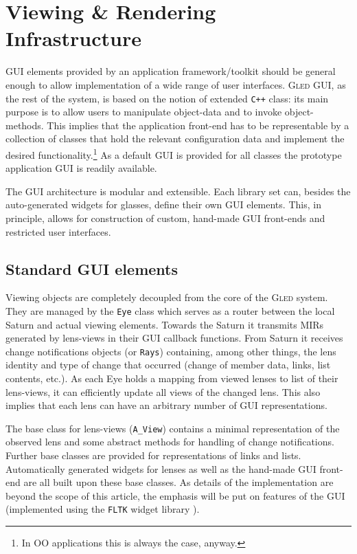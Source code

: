 \documentclass[final]{siamltex}
\def\gled{\textsc{Gled}\xspace}
\def\smalltt#1{{\small\texttt{#1}}}
\begin{document}
\section{Viewing \& Rendering Infrastructure}

GUI elements provided by an application framework/toolkit should be
general enough to allow implementation of a wide range of user
interfaces.  \gled GUI, as the rest of the system, is based on the
notion of extended \smalltt{C++} class: its main purpose is to allow
users to manipulate object-data and to invoke object-methods. This
implies that the application front-end has to be representable by a
collection of classes that hold the relevant configuration data and
implement the desired functionality.\footnote{In OO applications this
  is always the case, anyway.}  As a default GUI is provided for all
classes the prototype application GUI is readily available.

The GUI architecture is modular and extensible. Each library set can,
besides the auto-generated widgets for glasses, define their own GUI
elements. This, in principle, allows for construction of custom,
hand-made GUI front-ends and restricted user interfaces.

\subsection{Standard GUI elements}

Viewing objects are completely decoupled from the core of the \gled
system. They are managed by the \smalltt{Eye} class which serves as a
router between the local Saturn and actual viewing elements. Towards
the Saturn it transmits MIRs generated by lens-views in their GUI
callback functions. From Saturn it receives change notifications
objects (or \smalltt{Rays}) containing, among other things, the lens
identity and type of change that occurred (change of member data, links,
list contents, etc.). As each Eye holds a mapping from viewed
lenses to list of their lens-views, it can efficiently update all
views of the changed lens. This also implies that each lens can have
an arbitrary number of GUI representations.

The base class for lens-views (\smalltt{A\_View}) contains a minimal
representation of the observed lens and some abstract methods for handling
of change notifications. Further base classes are provided for
representations of links and lists.
%
Automatically generated widgets for lenses as well as the hand-made GUI
front-end are all built upon these base classes. As details of the
implementation are beyond the scope of this article, the emphasis will
be put on features of the GUI (implemented using the \smalltt{FLTK}
widget library \cite{fltk}).
\end{document}
